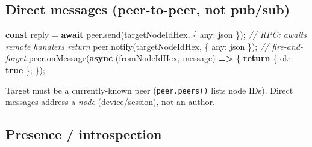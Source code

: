 \documentclass[
  nobib]{tufte-handout}
\newenvironment{Shaded}{}{}
\newcommand{\CommentTok}[1]{\textcolor[rgb]{0.38,0.63,0.69}{\textit{#1}}}
\newcommand{\ControlFlowTok}[1]{\textcolor[rgb]{0.00,0.44,0.13}{\textbf{#1}}}
\newcommand{\DataTypeTok}[1]{\textcolor[rgb]{0.56,0.13,0.00}{#1}}
\newcommand{\FunctionTok}[1]{\textcolor[rgb]{0.02,0.16,0.49}{#1}}
\newcommand{\KeywordTok}[1]{\textcolor[rgb]{0.00,0.44,0.13}{\textbf{#1}}}
\newcommand{\NormalTok}[1]{#1}
\newcommand{\OperatorTok}[1]{\textcolor[rgb]{0.40,0.40,0.40}{#1}}
\newcommand{\StringTok}[1]{\textcolor[rgb]{0.25,0.44,0.63}{#1}}
\begin{document}
\subsection{Direct messages (peer-to-peer, not
pub/sub)}\label{direct-messages-peer-to-peer-not-pubsub}

\begin{Shaded}
\begin{Highlighting}[]
\KeywordTok{const}\NormalTok{ reply }\OperatorTok{=} \ControlFlowTok{await}\NormalTok{ peer}\OperatorTok{.}\FunctionTok{send}\NormalTok{(targetNodeIdHex}\OperatorTok{,}\NormalTok{ \{ }\DataTypeTok{any}\OperatorTok{:} \StringTok{\textquotesingle{}json\textquotesingle{}}\NormalTok{ \})}\OperatorTok{;}  \CommentTok{// RPC: awaits remote handler\textquotesingle{}s return}
\NormalTok{peer}\OperatorTok{.}\FunctionTok{notify}\NormalTok{(targetNodeIdHex}\OperatorTok{,}\NormalTok{ \{ }\DataTypeTok{any}\OperatorTok{:} \StringTok{\textquotesingle{}json\textquotesingle{}}\NormalTok{ \})}\OperatorTok{;}                    \CommentTok{// fire{-}and{-}forget}
\NormalTok{peer}\OperatorTok{.}\FunctionTok{onMessage}\NormalTok{(}\KeywordTok{async}\NormalTok{ (fromNodeIdHex}\OperatorTok{,}\NormalTok{ message) }\KeywordTok{=\textgreater{}}\NormalTok{ \{ }\ControlFlowTok{return}\NormalTok{ \{ }\DataTypeTok{ok}\OperatorTok{:} \KeywordTok{true}\NormalTok{ \}}\OperatorTok{;}\NormalTok{ \})}\OperatorTok{;}
\end{Highlighting}
\end{Shaded}

Target must be a currently-known peer (\texttt{peer.peers()} lists node
IDs). Direct messages address a \emph{node} (device/session), not an
author.

\subsection{Presence / introspection}\label{presence-introspection}
\end{document}
